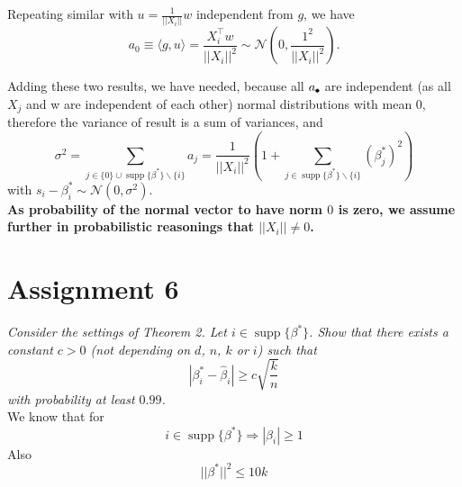 \documentclass[]{article}
\DeclareMathOperator\supp{supp}
\begin{document}
Repeating similar with $u=\frac{1}{||X_i||}w$ independent from $g$, we have $$a_0\equiv\langle g, u\rangle = \frac{X_i^\top w}{||X_i||^2}\sim\mathcal{N}\left(0, \frac{1^2}{||X_i||^2}\right).$$

Adding these two results, we have needed, because all $a_{\tikz\draw[black,fill=black] (0,0) circle (.3ex);}$ are independent (as all $X_j$ and w are independent of each other) normal distributions with mean 0, therefore the variance of result is a sum of variances, and
$$\sigma^2=\sum_{j \in \{0\}\cup \supp\{\beta^*\}\backslash \{i\}} a_j = \frac{1}{||X_i||^2}\left(1+\sum_{j\in\supp\{\beta^*\}\backslash \{i\}}(\beta_j^*)^2\right)$$
with $s_i-\beta_i^* \sim\mathcal{N}(0, \sigma^2)$.\\


\textbf{As probability of the normal vector to have norm $0$ is zero, we assume further in probabilistic reasonings that $||X_i|| \ne 0$.}
\section*{Assignment 6}
\textit{Consider the settings of Theorem 2. Let $i\in \supp\{\beta^*\}$. Show that there exists a constant $c>0$ (not depending on $d$, $n$, $k$ or $i$) such that}
\begin{equation}
|\beta_i^*-\hat{\beta}_i|\ge c\sqrt{\frac{k}{n}}
\end{equation}
\textit{with probability at least $0.99$.}\\



We know that for 
\begin{equation}
i\in\supp\{\beta^*\}\Rightarrow|\beta_i|\ge 1
\label{beta}
\end{equation} 
Also 
\begin{equation}
||\beta^*||^2\le 10k
\label{sum_beta}
\end{equation}
\end{document}
